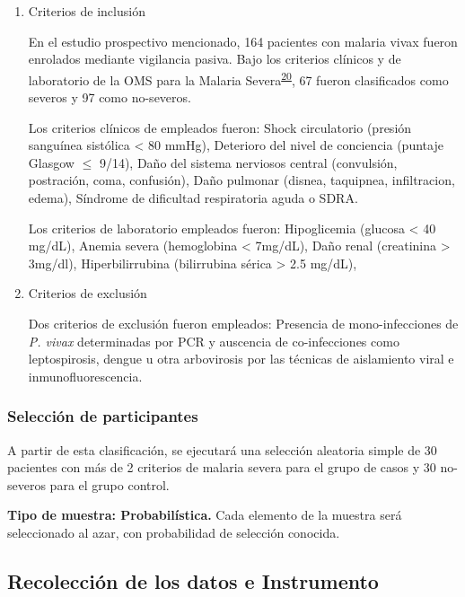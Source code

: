 \documentclass[]{article}
\begin{document}
\begin{enumerate}
\def\labelenumi{\alph{enumi}.}
\item
  Criterios de inclusión

  En el estudio prospectivo mencionado, 164 pacientes con malaria vivax
  fueron enrolados mediante vigilancia pasiva. Bajo los criterios
  clínicos y de laboratorio de la OMS para la Malaria
  Severa\textsuperscript{\protect\hyperlink{ref-WHO2014severe}{20}}, 67
  fueron clasificados como severos y 97 como no-severos.

  Los criterios clínicos de empleados fueron: Shock circulatorio
  (presión sanguínea sistólica \textless{} 80 mmHg), Deterioro del nivel
  de conciencia (puntaje Glasgow \(\le\) 9/14), Daño del sistema
  nerviosos central (convulsión, postración, coma, confusión), Daño
  pulmonar (disnea, taquipnea, infiltracion, edema), Síndrome de
  dificultad respiratoria aguda o SDRA.

  Los criterios de laboratorio empleados fueron: Hipoglicemia (glucosa
  \textless{} 40 mg/dL), Anemia severa (hemoglobina \textless{} 7mg/dL),
  Daño renal (creatinina \textgreater{} 3mg/dl), Hiperbilirrubina
  (bilirrubina sérica \textgreater{} 2.5 mg/dL), 
\item
  Criterios de exclusión

  Dos criterios de exclusión fueron empleados: Presencia de
  mono-infecciones de \emph{P. vivax} determinadas por PCR y auscencia
  de co-infecciones como leptospirosis, dengue u otra arbovirosis por
  las técnicas de aislamiento viral e inmunofluorescencia.
\end{enumerate}

\subsubsection{Selección de
participantes}\label{seleccion-de-participantes}

A partir de esta clasificación, se ejecutará una selección aleatoria
simple de 30 pacientes con más de 2 criterios de malaria severa para el
grupo de casos y 30 no-severos para el grupo control.

\textbf{Tipo de muestra: Probabilística.} Cada elemento de la muestra
será seleccionado al azar, con probabilidad de selección conocida.

\subsection{Recolección de los datos e
Instrumento}\label{recoleccion-de-los-datos-e-instrumento}
\end{document}
